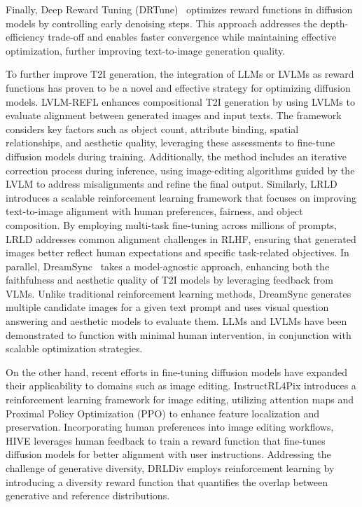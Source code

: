 Finally, Deep Reward Tuning (DRTune)~\citep{wu2025deep} optimizes reward functions in diffusion models by controlling early denoising steps. This approach addresses the depth-efficiency trade-off and enables faster convergence while maintaining effective optimization, further improving text-to-image generation quality.

To further improve T2I generation, the integration of LLMs or LVLMs as reward functions has proven to be a novel and effective strategy for optimizing diffusion models. LVLM-REFL \citep{wen2023improving} enhances compositional T2I generation by using LVLMs to evaluate alignment between generated images and input texts. The framework considers key factors such as object count, attribute binding, spatial relationships, and aesthetic quality, leveraging these assessments to fine-tune diffusion models during training. Additionally, the method includes an iterative correction process during inference, using image-editing algorithms guided by the LVLM to address misalignments and refine the final output. Similarly, LRLD~\citep{zhang2025large} introduces a scalable reinforcement learning framework that focuses on improving text-to-image alignment with human preferences, fairness, and object composition. By employing multi-task fine-tuning across millions of prompts, LRLD addresses common alignment challenges in RLHF, ensuring that generated images better reflect human expectations and specific task-related objectives. In parallel, DreamSync~\citep{sun2023dreamsync} takes a model-agnostic approach, enhancing both the faithfulness and aesthetic quality of T2I models by leveraging feedback from VLMs. Unlike traditional reinforcement learning methods, DreamSync generates multiple candidate images for a given text prompt and uses visual question answering and aesthetic models to evaluate them. LLMs and LVLMs have been demonstrated to function with minimal human intervention, in conjunction with scalable optimization strategies.

On the other hand, recent efforts in fine-tuning diffusion models have expanded their applicability to domains such as image editing. InstructRL4Pix \citep{li2024instructrl4pix} introduces a reinforcement learning framework for image editing, utilizing attention maps and Proximal Policy Optimization (PPO) to enhance feature localization and preservation. Incorporating human preferences into image editing workflows, HIVE \citep{zhang2024hive} leverages human feedback to train a reward function that fine-tunes diffusion models for better alignment with user instructions. Addressing the challenge of generative diversity, DRLDiv \citep{miao2024training} employs reinforcement learning by introducing a diversity reward function that quantifies the overlap between generative and reference distributions. 

